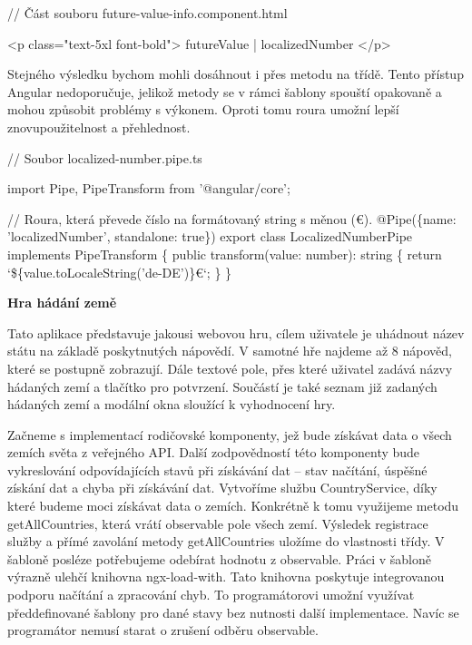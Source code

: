 \begin{prog}
// Část souboru future-value-info.component.html

<p class="text-5xl font-bold">{{ futureValue | localizedNumber }}</p>
\end{prog}

Stejného výsledku bychom mohli dosáhnout i přes metodu na třídě. Tento přístup Angular nedoporučuje, jelikož metody se v rámci šablony spouští opakovaně a mohou způsobit problémy s výkonem. 
Oproti tomu roura umožní lepší znovupoužitelnost a přehlednost.

\begin{prog}
// Soubor localized-number.pipe.ts

import {Pipe, PipeTransform} from '@angular/core';

// Roura, která převede číslo na formátovaný string s měnou (€).
@Pipe(\{name: 'localizedNumber', standalone: true\})
export class LocalizedNumberPipe implements PipeTransform \{
  public transform(value: number): string \{
    return `\$\{value.toLocaleString('de-DE')\}€`;
  \}
\}
\end{prog}

\begin{flushleft}
  \textbf{Hra hádání země}
\end{flushleft}

Tato aplikace představuje jakousi webovou hru, cílem uživatele je uhádnout název státu na základě poskytnutých nápovědí. 
V samotné hře najdeme až 8 nápověd, které se postupně zobrazují. Dále textové pole, přes které uživatel zadává názvy hádaných zemí a tlačítko pro potvrzení. 
Součástí je také seznam již zadaných hádaných zemí a modální okna sloužící k vyhodnocení hry.

Začneme s implementací rodičovské komponenty, jež bude získávat data o všech zemích světa z veřejného API. 
Další zodpovědností této komponenty bude vykreslování odpovídajících stavů při získávání dat -- stav načítání, úspěšné získání dat a chyba při získávání dat. 
Vytvoříme službu CountryService, díky které budeme moci získávat data o zemích. Konkrétně k tomu využijeme metodu getAllCountries, která vrátí observable pole všech zemí. 
Výsledek registrace služby a přímé zavolání metody getAllCountries uložíme do vlastnosti třídy. V šabloně posléze potřebujeme odebírat hodnotu z observable. 
Práci v šabloně výrazně ulehčí knihovna ngx-load-with. Tato knihovna poskytuje integrovanou podporu načítání a zpracování chyb. 
To programátorovi umožní využívat předdefinované šablony pro dané stavy bez nutnosti další implementace. Navíc se programátor nemusí starat o zrušení odběru observable.


